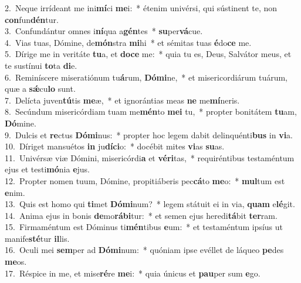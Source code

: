 {2.~}Neque irrídeant me ini\textbf{mí}ci \textbf{me}i:~* étenim univérsi, qui sústinent te, non \textbf{con}fun\textbf{dén}tur.\\
{3.~}Confundántur omnes i\textbf{ní}qua a\textbf{gén}tes~* \textbf{su}per\textbf{vá}cue.\\
{4.~}Vias tuas, Dómine, de\textbf{món}stra \textbf{mi}hi~* et sémitas tuas \textbf{é}do\textbf{ce} me.\\
{5.~}Dírige me in veritáte \textbf{tu}a, et \textbf{do}\textbf{ce} me:~* quia tu es, Deus, Salvátor meus, et te sustínui \textbf{to}ta \textbf{di}e.\\
{6.~}Reminíscere miseratiónum tu\textbf{á}rum, \textbf{Dó}\textbf{mi}ne,~* et misericordiárum tuárum, quæ a \textbf{sǽ}cu\textbf{lo} sunt.\\
{7.~}Delícta juven\textbf{tú}tis \textbf{me}æ,~* et ignorántias meas \textbf{ne} me\textbf{mí}neris.\\
{8.~}Secúndum misericórdiam tuam me\textbf{mén}to \textbf{me}\textbf{i} tu,~* propter bonitátem \textbf{tu}am, \textbf{Dó}mine.\\
{9.~}Dulcis et \textbf{re}ctus \textbf{Dó}\textbf{mi}nus:~* propter hoc legem dabit delinquénti\textbf{bus} in \textbf{vi}a.\\
{10.~}Díriget mansuétos \textbf{in} ju\textbf{dí}\textbf{ci}o:~* docébit mites \textbf{vi}as \textbf{su}as.\\
{11.~}Univérsæ viæ Dómini, misericórdi\textbf{a} et \textbf{vé}\textbf{ri}tas,~* requiréntibus testaméntum ejus et testi\textbf{mó}nia \textbf{e}jus.\\
{12.~}Propter nomen tuum, Dómine, propitiáberis pec\textbf{cá}to \textbf{me}o:~* \textbf{mul}tum est \textbf{e}nim.\\
{13.~}Quis est homo qui \textbf{ti}met \textbf{Dó}\textbf{mi}num?~* legem státuit ei in via, \textbf{quam} e\textbf{lé}git.\\
{14.~}Anima ejus in bonis \textbf{de}mo\textbf{rá}\textbf{bi}tur:~* et semen ejus heredi\textbf{tá}bit \textbf{ter}ram.\\
{15.~}Firmaméntum est Dóminus ti\textbf{mén}tibus \textbf{e}um:~* et testaméntum ipsíus ut manife\textbf{sté}tur \textbf{il}lis.\\
{16.~}Oculi mei \textbf{sem}per ad \textbf{Dó}\textbf{mi}num:~* quóniam ipse evéllet de láqueo \textbf{pe}des \textbf{me}os.\\
{17.~}Réspice in me, et mise\textbf{ré}re \textbf{me}i:~* quia únicus et \textbf{pau}per sum \textbf{e}go.\\
